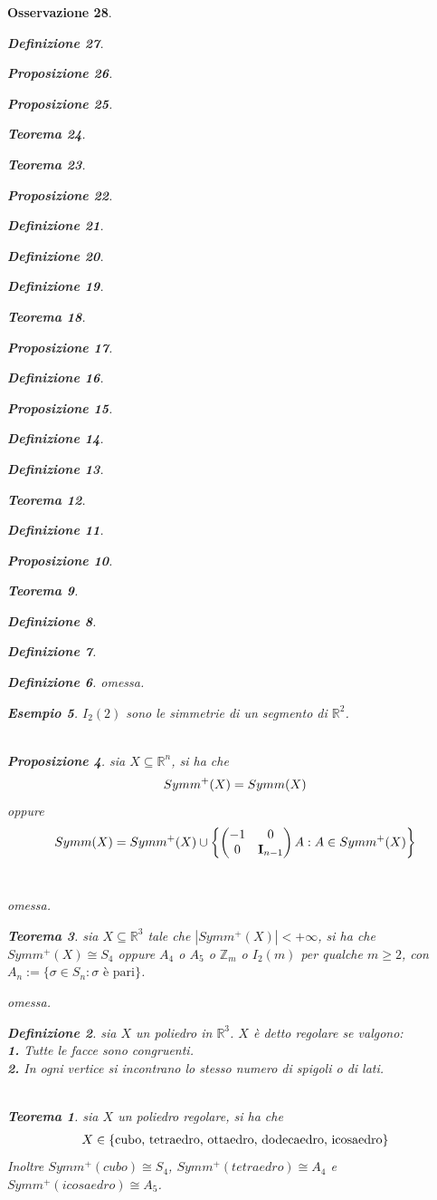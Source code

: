 \documentclass[oneside, 11pt]{amsbook}
\makeatletter
\newcommand{\0}{{(0)}}
\newcommand{\3}{{(3)}}
\theoremstyle{colonplain}
\newtheorem{thm}{Teorema}[chapter]
\newtheorem{prop}[thm]{Proposizione}
\theoremstyle{colondefinition}
\newtheorem{defn}[thm]{Definizione}
\newtheorem{ex}[thm]{Esempio}
\theoremstyle{colonremark}
\newtheorem{rmk}[thm]{Osservazione}
\numberwithin{equation}{chapter}
\renewcommand{\proofname}{Dimostrazione}
\renewenvironment{proof}[1][\proofname]{\par
  \pushQED{\end{proof}}%
  \normalfont \topsep6\p@\@plus6\p@\relax
  \trivlist
  \item[\hskip\labelsep\bfseries #1:]\ignorespaces
}{%
  \popQED\endtrivlist\@endpefalse
}
\makeatother
\begin{document}
\begin{rmk}
\begin{defn}
\begin{prop}
\begin{prop}
\begin{thm}
\begin{thm}
\begin{prop}
\begin{defn}
\begin{defn}
\begin{defn}
\begin{thm}
\begin{prop}
\begin{defn}
\begin{prop}
\begin{defn}
\begin{defn}
\begin{thm}
\begin{defn}
\begin{prop}
\begin{thm}
\begin{defn}
\begin{defn}
\begin{defn}
\begin{proof} omessa. \end{proof}
\begin{ex} $I_2(2)$ sono le simmetrie di un segmento di $\mathbb{R}^2$. \\ \\
\begin{prop} sia $X \subseteq \mathbb{R}^n$, si ha che
\begin{align}
    Symm^+(X) = Symm(X) \notag
\end{align}
oppure
\begin{align}
    Symm(X) = Symm^+(X) \cup \left\{ \begin{pmatrix}
        -1 & 0 \\
        0 & \mathbf{I}_{n - 1}
    \end{pmatrix} A : A \in Symm^+(X) \right\} \notag
\end{align} \\

\begin{proof} omessa. \end{proof}
\begin{thm} sia $X \subseteq \mathbb{R}^3$ tale che $|Symm^+(X)| < +\infty$, si ha che $Symm^+(X) \cong S_4$ oppure $A_4$ o $A_5$ o $\mathbb{Z}_m$ o $I_2(m)$ per qualche $m \geq 2$, con $A_n := \{ \sigma \in S_n : \sigma \text{ è pari} \}$. \\

\begin{proof} omessa. \end{proof}
\begin{defn} sia $X$ un poliedro in $\mathbb{R}^3$. $X$ è detto \textit{regolare} se valgono: \\
\textbf{1.} Tutte le facce sono congruenti. \\
\textbf{2.} In ogni vertice si incontrano lo stesso numero di spigoli o di lati. \\ \\
\begin{thm} sia $X$ un poliedro regolare, si ha che
\begin{align}
    X \in \{ \text{cubo, tetraedro, ottaedro, dodecaedro, icosaedro} \} \notag
\end{align}
Inoltre $Symm^+(cubo) \cong S_4$, $Symm^+(tetraedro) \cong A_4$ e $Symm^+(icosaedro) \cong A_5$. \\


\end{thm}
\end{defn}
\end{thm}
\end{prop}
\end{ex}
\end{defn}
\end{defn}
\end{defn}
\end{thm}
\end{prop}
\end{defn}
\end{thm}
\end{defn}
\end{defn}
\end{prop}
\end{defn}
\end{prop}
\end{thm}
\end{defn}
\end{defn}
\end{defn}
\end{prop}
\end{thm}
\end{thm}
\end{prop}
\end{prop}
\end{defn}
\end{rmk}
\end{document}
